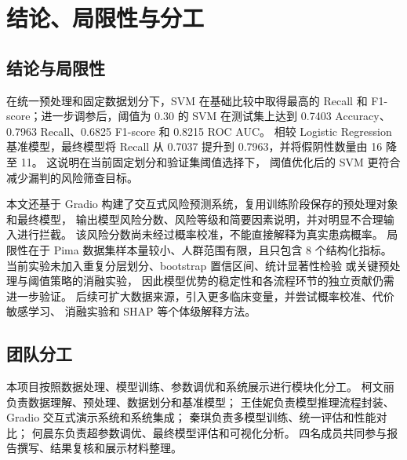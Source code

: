 \section{结论、局限性与分工}

\subsection{结论与局限性}

在统一预处理和固定数据划分下，SVM 在基础比较中取得最高的
Recall 和 F1-score；进一步调参后，阈值为 0.30 的 SVM 在测试集上达到
0.7403 Accuracy、0.7963 Recall、0.6825 F1-score 和 0.8215 ROC AUC。
相较 Logistic Regression 基准模型，最终模型将 Recall 从 0.7037
提升到 0.7963，并将假阴性数量由 16 降至 11。
这说明在当前固定划分和验证集阈值选择下，
阈值优化后的 SVM 更符合减少漏判的风险筛查目标。

本文还基于 Gradio 构建了交互式风险预测系统，复用训练阶段保存的预处理对象和最终模型，
输出模型风险分数、风险等级和简要因素说明，并对明显不合理输入进行拦截。
该风险分数尚未经过概率校准，不能直接解释为真实患病概率。
局限性在于 Pima 数据集样本量较小、人群范围有限，且只包含 8 个结构化指标。
当前实验未加入重复分层划分、bootstrap 置信区间、统计显著性检验
或关键预处理与阈值策略的消融实验，
因此模型优势的稳定性和各流程环节的独立贡献仍需进一步验证。
后续可扩大数据来源，引入更多临床变量，并尝试概率校准、代价敏感学习、
消融实验和 SHAP 等个体级解释方法。

\subsection{团队分工}

本项目按照数据处理、模型训练、参数调优和系统展示进行模块化分工。
柯文丽负责数据理解、预处理、数据划分和基准模型；
王佳妮负责模型推理流程封装、Gradio 交互式演示系统和系统集成；
秦琪负责多模型训练、统一评估和性能对比；
何晨东负责超参数调优、最终模型评估和可视化分析。
四名成员共同参与报告撰写、结果复核和展示材料整理。
